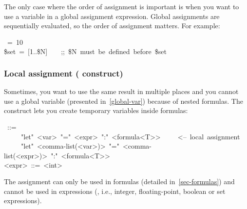 {The only case where the order of assignment is important is when you
want to use a variable in a global assignment expression. Global
assignments are sequentially evaluated, so the order of assignment
matters. For example:%
\begin{mdpre}%
~=~{10}\\
{\$set}~=~{}[{1}..{\$N}]~~~~{;;~\$N~must~be~defined~before~\$set}%
\end{mdpre}
\subsubsection{Local assignment ( construct)}\label{let-binding}%

\noindent Sometimes, you want to use the same result in multiple places and you
cannot use a global variable (presented in~\ref{global-var}) because of
nested formulas. The  construct lets you create temporary
variables inside formulas:%
\begin{mdpre}%
~::=\\
~~~~\textbar{}~"let"~{\textless{}var\textgreater{}}~"="~{\textless{}expr\textgreater{}}~":"~{\textless{}formula\textless{}T\textgreater{}\textgreater{}}~~~~~{\textless{}--~local~assignment}\\
~~~~\textbar{}~"let"~{\textless{}comma-list(\textless{}var\textgreater{})\textgreater{}}~"="~{\textless{}comma-list(\textless{}expr\textgreater{})\textgreater{}}~":"~{\textless{}formula\textless{}T\textgreater{}\textgreater{}}\\
{\textless{}expr\textgreater{}}~::=~{\textless{}int\textgreater{}}%
\end{mdpre}\noindent The  assignment can only be used in formulas (detailed
in~\ref{sec-formulas}) and cannot be used in expressions (, i.e.,
integer, floating-point, boolean or set expressions).

}
